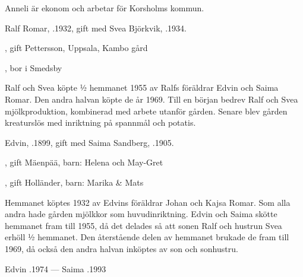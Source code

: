 Anneli är ekonom och arbetar för Korsholms kommun.



Ralf Romar, .1932, gift med Svea Björkvik, .1934.
\begin{jhchildren}
  \item {}, gift Pettersson, Uppsala, Kambo gård
  \item {}, bor i Smedsby
\end{jhchildren}
Ralf och Svea köpte ½ hemmanet 1955 av Ralfs föräldrar Edvin och Saima Romar. Den andra halvan köpte de  år 1969. Till en början bedrev Ralf och Svea mjölkproduktion, kombinerad med arbete utanför gården. Senare blev gården kreaturslös med inriktning på spannmål och potatis.


Edvin, .1899, gift med Saima Sandberg, .1905.
\begin{jhchildren}
  \item {}, gift Mäenpää, barn: Helena och May-Gret
  \item {}
  \item {}, gift Holländer, barn: Marika \& Mats
\end{jhchildren}

Hemmanet köptes  1932  av Edvins föräldrar Johan och Kajsa Romar. Som alla andra hade gården mjölkkor som huvudinriktning. Edvin och Saima skötte hemmanet fram till 1955, då det delades så att sonen Ralf och hustrun Svea erhöll ½ hemmanet.  Den återstående delen av hemmanet brukade de fram till 1969, då också den andra halvan inköptes av son och sonhustru.

Edvin .1974  ---  Saima .1993


